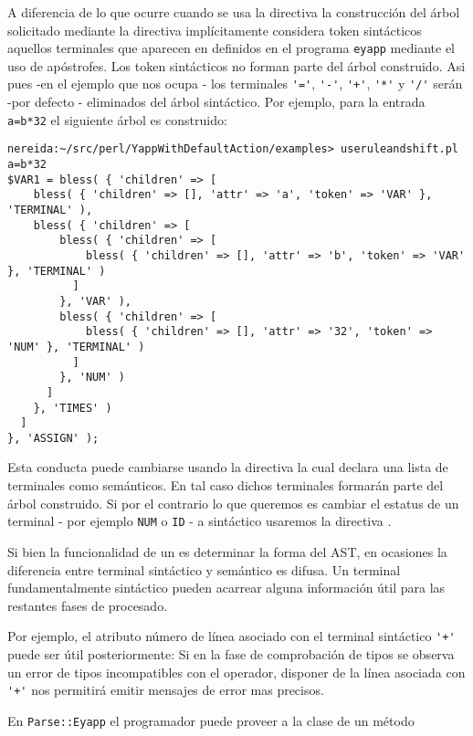 A diferencia de lo que ocurre cuando se usa la directiva 
la construcción del árbol solicitado mediante la directiva 
implícitamente considera token sintácticos aquellos terminales que aparecen en 
definidos en el programa \verb|eyapp| mediante el uso de apóstrofes.
Los token sintácticos no forman parte del árbol construido.
Asi pues -en el ejemplo que nos ocupa - los terminales \verb|'='|,
\verb|'-'|,
\verb|'+'|,
\verb|'*'| y
\verb|'/'|
serán -por defecto - eliminados del árbol sintáctico. 
Por ejemplo, para la entrada \verb|a=b*32| el siguiente árbol es construido:
\begin{verbatim}
nereida:~/src/perl/YappWithDefaultAction/examples> useruleandshift.pl
a=b*32
$VAR1 = bless( { 'children' => [
    bless( { 'children' => [], 'attr' => 'a', 'token' => 'VAR' }, 'TERMINAL' ),
    bless( { 'children' => [
        bless( { 'children' => [
            bless( { 'children' => [], 'attr' => 'b', 'token' => 'VAR' }, 'TERMINAL' )
          ]
        }, 'VAR' ),
        bless( { 'children' => [
            bless( { 'children' => [], 'attr' => '32', 'token' => 'NUM' }, 'TERMINAL' )
          ]
        }, 'NUM' )
      ]
    }, 'TIMES' )
  ]
}, 'ASSIGN' );
\end{verbatim}
Esta conducta puede cambiarse usando la directiva 
la cual declara una lista de terminales como semánticos. En tal caso 
dichos terminales formarán parte del árbol construido. Si por el contrario
lo que queremos es cambiar el estatus de un terminal
- por ejemplo \verb|NUM| o \verb|ID| - a sintáctico usaremos
la directiva .


Si bien la funcionalidad de un 
es determinar la forma del AST, en ocasiones la diferencia 
entre terminal sintáctico y semántico es difusa. Un terminal 
fundamentalmente sintáctico 
pueden acarrear alguna información útil para las restantes fases de 
procesado.

Por ejemplo, el atributo número de línea asociado con
el terminal sintáctico \verb|'+'| puede ser útil posteriormente:
Si en la fase de comprobación de tipos se observa un error
de tipos incompatibles con el operador, disponer de la línea
asociada con \verb|'+'| nos permitirá emitir mensajes de error 
mas precisos.

En \verb|Parse::Eyapp| el programador puede proveer a la clase 
 de un método 

